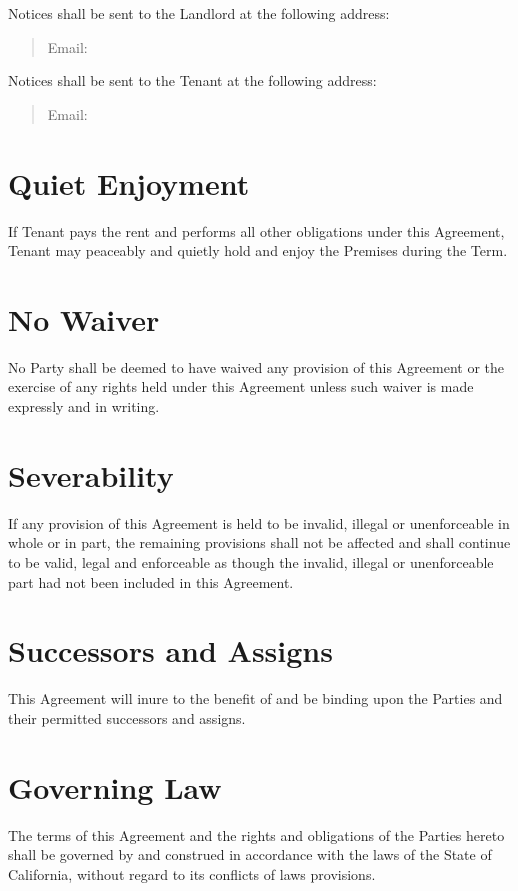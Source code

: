 \documentclass[12pt]{article}
\begin{document}
{Notices shall be sent to the Landlord at the following address:

\begin{quote}
    Email: %
\end{quote}

Notices shall be sent to the Tenant at the following address:

\begin{quote}
    Email: %
\end{quote}

\section{Quiet Enjoyment}
If Tenant pays the rent and performs all other obligations under this Agreement, Tenant may
peaceably and quietly hold and enjoy the Premises during the Term.

\section{No Waiver}
No Party shall be deemed to have waived any provision of this Agreement or the exercise of any
rights held under this Agreement unless such waiver is made expressly and in writing.

\section{Severability}
If any provision of this Agreement is held to be invalid, illegal or unenforceable in whole or
in part, the remaining provisions shall not be affected and shall continue to be valid, legal
and enforceable as though the invalid, illegal or unenforceable part had not been included in
this Agreement.

\section{Successors and Assigns}
This Agreement will inure to the benefit of and be binding upon the Parties and their permitted
successors and assigns.

\section{Governing Law}
The terms of this Agreement and the rights and obligations of the Parties hereto shall be
governed by and construed in accordance with the laws of the State of California, without
regard to its conflicts of laws provisions.

}
\end{document}
